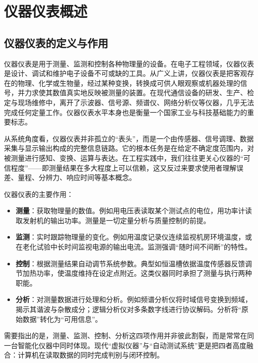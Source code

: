 
\chapter{仪器仪表概述}
\label{chap:instruments_overview}

\section{仪器仪表的定义与作用}
\label{sec:instruments_definition}

仪器仪表是用于测量、监测和控制各种物理量的设备。在电子工程领域，仪器仪表是设计、调试和维护电子设备不可或缺的工具。从广义上讲，仪器仪表是把客观存在的物理、化学或生物量，经过某种变换，转换成可供人眼观察或机器处理的信号，并力求使其数值真实地反映被测量的装置。在现代通信设备的研发、生产、检定与现场维修中，离开了示波器、信号源、频谱仪、网络分析仪等仪器，几乎无法完成任何定量工作。仪器仪表水平本身也是衡量一个国家工业与科技基础能力的重要标志。

从系统角度看，仪器仪表并非孤立的“表头”，而是一个由传感器、信号调理、数据采集与显示输出构成的完整信息链路。它的根本任务是在给定不确定度范围内，对被测量进行感知、变换、运算与表达。在工程实践中，我们往往更关心仪器的“可信程度”——即测量结果在多大程度上可以信赖，这又反过来要求使用者理解误差、量程、分辨力、响应时间等基本概念。

仪器仪表的主要作用：
\begin{itemize}
    \item \textbf{测量}：获取物理量的数值。例如用电压表读取某个测试点的电位，用功率计读取发射机的输出功率。测量是一切定量分析与质量控制的前提。
    \item \textbf{监测}：实时跟踪物理量的变化。例如用温度记录仪连续监视机房环境温度，或在老化试验中长时间监视电源的输出电流。监测强调“随时间不间断”的特性。
    \item \textbf{控制}：根据测量结果自动调节系统参数。典型如恒温槽依据温度传感器反馈调节加热功率，使温度维持在设定点附近。这类仪器同时承担了测量与执行两种职能。
    \item \textbf{分析}：对测量数据进行处理和分析。例如频谱分析仪将时域信号变换到频域，揭示其谐波与杂散成分；逻辑分析仪对多条数字线进行协议解码。分析将“原始数据”转化为“可用信息”。
\end{itemize}

需要指出的是，测量、监测、控制、分析这四项作用并非彼此割裂，而是常常在同一台智能化仪器中同时体现。现代“虚拟仪器”与“自动测试系统”更是把四者高度融合：计算机在读取数据的同时完成判别与闭环控制。

